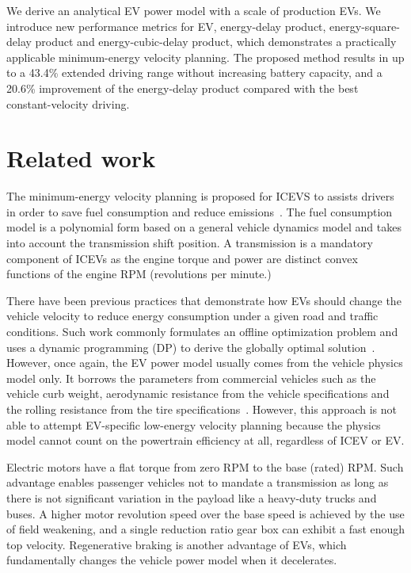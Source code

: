 \documentclass{IEEEtran}
\begin{document}
We derive an analytical EV power model with a scale of production EVs. We introduce new performance metrics for EV, energy-delay product, energy-square-delay product and energy-cubic-delay product, which demonstrates a practically applicable minimum-energy velocity planning. The proposed method results in up to a 43.4\% extended driving range without increasing battery capacity, and a 20.6\% improvement of the energy-delay product compared with the best constant-velocity driving. 

\section{Related work} \label{sec:related work}
  
The minimum-energy velocity planning is proposed for ICEVS to assists drivers in order to save fuel consumption and reduce emissions~\cite{Seraens:thesis12, Kamal:TITS11, Ozatay:TITS14, Dovgana:ASC14, Ozatay:IFAC14, Khayyam:ESA12}.  
The fuel consumption model is a polynomial form based on a general vehicle dynamics model and takes into account the transmission shift position. A transmission is a mandatory component of ICEVs as the engine torque and power are distinct convex functions of the engine RPM (revolutions per minute.) 

There have been previous practices that demonstrate how EVs should change the vehicle velocity to reduce energy consumption under  a given road and traffic conditions. Such work commonly formulates an offline optimization problem and uses a dynamic programming (DP) to derive the globally optimal solution~\cite{Lin:ICCA14, Dib:IVPPC11, Dib:OGST12, Mensing:TR13}. However, once again, the EV power model usually comes from the vehicle physics model only. It borrows the parameters from commercial vehicles such as the vehicle curb weight, aerodynamic resistance from the vehicle specifications and the rolling resistance from the tire specifications~\cite{Lin:ICCA14}. However, this approach is not able to attempt EV-specific low-energy velocity planning because the physics model cannot count on the powertrain efficiency at all, regardless of ICEV or EV.  

Electric motors have a flat torque from zero RPM to the base (rated) RPM. Such advantage enables passenger vehicles not to mandate a transmission as long as there is not significant variation in the payload like a heavy-duty trucks and buses. A higher motor revolution speed over the base speed is achieved by the use of field weakening, and a single reduction ratio gear box can exhibit a fast enough top velocity. Regenerative braking is another advantage of EVs, which fundamentally changes the vehicle power model when it decelerates.
					
\end{document}
